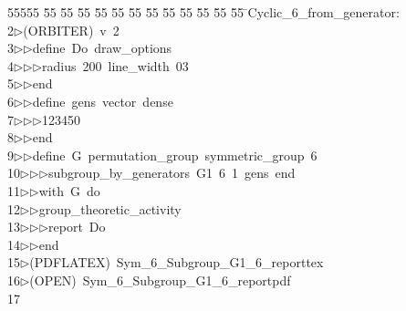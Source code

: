 %
%
\begin{tabbing}
55555 \= 55 \= 55 \= 55 \= 55 \= 55 \= 55 \= 55 \= 55 \= 55 \= 55 \= 55 \= 55 \= \>Cyclic\_6\_from\_generator:\\[0pt]
2\>$\triangleright$\>(ORBITER)\ v\ 2\ \\[0pt]
3\>$\triangleright$\>$\triangleright$\>define\ Do\ draw\_options\ \\[0pt]
4\>$\triangleright$\>$\triangleright$\>$\triangleright$\>radius\ 200\ line\_width\ 03\ \\[0pt]
5\>$\triangleright$\>$\triangleright$\>end\ \\[0pt]
6\>$\triangleright$\>$\triangleright$\>define\ gens\ vector\ dense\ \\[0pt]
7\>$\triangleright$\>$\triangleright$\>$\triangleright$\>123450\ \\[0pt]
8\>$\triangleright$\>$\triangleright$\>end\ \\[0pt]
9\>$\triangleright$\>$\triangleright$\>define\ G\ permutation\_group\ symmetric\_group\ 6\ \\[0pt]
10\>$\triangleright$\>$\triangleright$\>$\triangleright$\>subgroup\_by\_generators\ G1\ 6\ 1\ gens\ end\ \\[0pt]
11\>$\triangleright$\>$\triangleright$\>with\ G\ do\ \\[0pt]
12\>$\triangleright$\>$\triangleright$\>group\_theoretic\_activity\ \\[0pt]
13\>$\triangleright$\>$\triangleright$\>$\triangleright$\>report\ Do\ \\[0pt]
14\>$\triangleright$\>$\triangleright$\>end\\[0pt]
15\>$\triangleright$\>(PDFLATEX)\ Sym\_6\_Subgroup\_G1\_6\_reporttex\\[0pt]
16\>$\triangleright$\>(OPEN)\ Sym\_6\_Subgroup\_G1\_6\_reportpdf\\[0pt]
17\>\end{tabbing}
